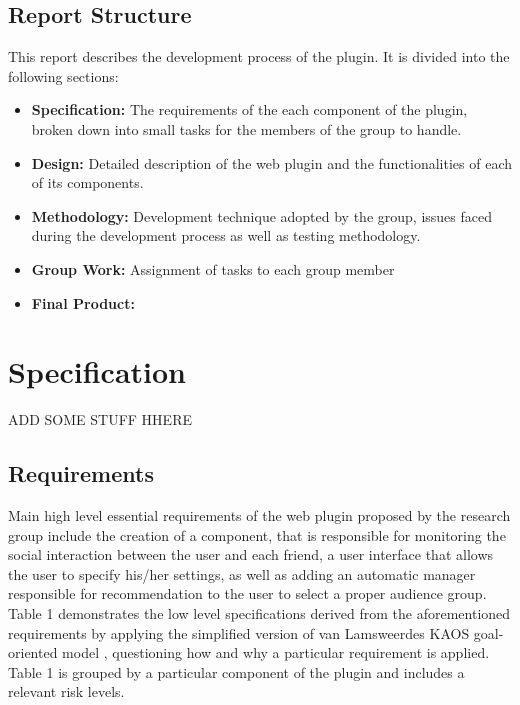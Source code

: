 \documentclass[a4paper,11pt]{article}
\begin{document}
\subsection {Report Structure}
\indent This report describes the development process of the plugin. It is divided into the following sections:

\begin{itemize}

\item \textbf{Specification:} The requirements of the each component of the plugin, broken down into small tasks for the members of the group to handle.

\item \textbf{Design:} Detailed description of the web plugin and the functionalities of each of its components.

\item \textbf{Methodology:} Development technique adopted by the group, issues faced during the development process as well as testing methodology.

\item \textbf{Group Work:} Assignment of tasks to each group member

\item \textbf{Final Product:} 

\end{itemize}

\section{Specification}

ADD SOME STUFF HHERE
\subsection{Requirements}
\noindent Main high level essential requirements of the web plugin proposed by the research group include the creation of a component, that is responsible for monitoring the social interaction between the user and each friend, a user interface that allows the user to specify his/her settings, as well as adding an automatic manager responsible for recommendation to the user to select a proper audience group. Table 1 demonstrates the low level specifications derived from the aforementioned requirements by applying the simplified version of van Lamsweerde\textquotesingle s KAOS goal-oriented model \cite{KAOS}, questioning how and why a particular requirement is applied. Table 1 is grouped by a particular component of the plugin and includes a relevant risk levels.
\end{document}
